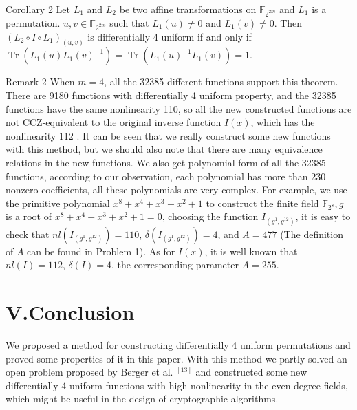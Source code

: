\documentclass[10pt]{article}
\begin{document}
Corollary 2 Let $L_{1}$ and $L_{2}$ be two affine transformations on $\mathbb{F}_{2^{2 m}}$ and $L_{1}$ is a permutation. $u, v \in \mathbb{F}_{2^{2 m}}$ such that $L_{1}(u) \neq 0$ and $L_{1}(v) \neq 0$. Then $\left(L_{2} \circ I \circ L_{1}\right)_{(u, v)}$ is differentially 4 uniform if and only if $\operatorname{Tr}\left(L_{1}(u) L_{1}(v)^{-1}\right)= \operatorname{Tr}\left(L_{1}(u)^{-1} L_{1}(v)\right)=1$.

Remark 2 When $m=4$, all the 32385 different functions support this theorem. There are 9180 functions with differentially 4 uniform property, and the 32385 functions have the same nonlinearity 110, so all the new constructed functions are not CCZ-equivalent to the original inverse function $I(x)$, which has the nonlinearity 112 . It can be seen that we really construct some new functions with this method, but we should also note that there are many equivalence relations in the new functions. We also get polynomial form of all the 32385 functions, according to our observation, each polynomial has more than 230 nonzero coefficients, all these polynomials are very complex. For example, we use the primitive polynomial $x^{8}+x^{4}+x^{3}+x^{2}+1$ to construct the finite field $\mathbb{F}_{2^{8}}, g$ is a root of $x^{8}+x^{4}+x^{3}+x^{2}+1=0$, choosing the function $I_{\left(g^{1}, g^{12}\right)}$, it is easy to check that $n l\left(I_{\left(g^{1}, g^{12}\right)}\right)=110$, $\delta\left(I_{\left(g^{1}, g^{12}\right)}\right)=4$, and $A=477$ (The definition of $A$ can be found in Problem 1). As for $I(x)$, it is well known that $n l(I)=112$, $\delta(I)=4$, the corresponding parameter $A=255$.

\section*{V.Conclusion}
We proposed a method for constructing differentially 4 uniform permutations and proved some properties of it in this paper. With this method we partly solved an open problem proposed by Berger et al. ${ }^{[13]}$ and constructed some new differentially 4 uniform functions with high nonlinearity in the even degree fields, which might be useful in the design of cryptographic algorithms.
\end{document}
